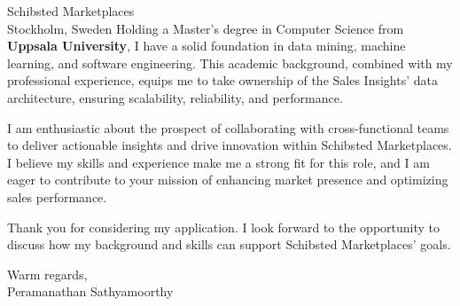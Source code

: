 \documentclass{letter}
\begin{document}
\begin{letter}{Schibsted Marketplaces\\
Stockholm, Sweden}
Holding a Master's degree in Computer Science from \textbf{Uppsala University}, I have a solid foundation in data mining, machine learning, and software engineering. This academic background, combined with my professional experience, equips me to take ownership of the Sales Insights' data architecture, ensuring scalability, reliability, and performance.

I am enthusiastic about the prospect of collaborating with cross-functional teams to deliver actionable insights and drive innovation within Schibsted Marketplaces. I believe my skills and experience make me a strong fit for this role, and I am eager to contribute to your mission of enhancing market presence and optimizing sales performance.

Thank you for considering my application. I look forward to the opportunity to discuss how my background and skills can support Schibsted Marketplaces' goals.

\closing{Warm regards,\\[2ex]
Peramanathan Sathyamoorthy}

\end{letter}
\end{document}
